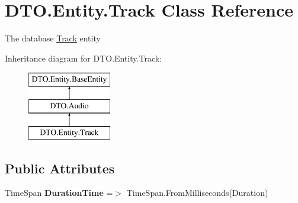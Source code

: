\hypertarget{class_d_t_o_1_1_entity_1_1_track}{}\section{D\+T\+O.\+Entity.\+Track Class Reference}
\label{class_d_t_o_1_1_entity_1_1_track}


The database \hyperlink{class_d_t_o_1_1_entity_1_1_track}{Track} entity  


Inheritance diagram for D\+T\+O.\+Entity.\+Track\+:\begin{figure}[H]
\begin{center}
\leavevmode
\includegraphics[height=3.000000cm]{class_d_t_o_1_1_entity_1_1_track}
\end{center}
\end{figure}
\subsection*{Public Attributes}
\begin{DoxyCompactItemize}
\item 
\mbox{\label{class_d_t_o_1_1_entity_1_1_track_a9d78da85a455dfc89c12398a23a66877}} 
Time\+Span {\bfseries Duration\+Time} =$>$ Time\+Span.\+From\+Milliseconds(Duration)
\end{DoxyCompactItemize}
